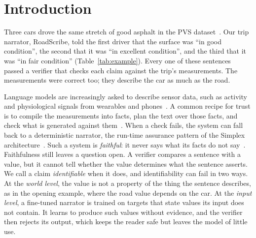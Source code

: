 \section{Introduction}
\label{sec:intro}

Three cars drove the same stretch of good asphalt in the PVS dataset~\cite{menegazzo2021pvs}.
Our trip narrator, RoadScribe, told the first driver that the surface was ``in good condition'', the second that it was ``in excellent condition'', and the third that it was ``in fair condition'' (Table~\ref{tab:example}).
Every one of these sentences passed a verifier that checks each claim against the trip's measurements.
The measurements were correct too; they describe the car as much as the road.

Language models are increasingly asked to describe sensor data, such as activity and physiological signals from wearables and phones~\cite{xu2024penetrative,li2025sensorllm,zhang2025sensorlm}.
A common recipe for trust is to compile the measurements into facts, plan the text over those facts, and check what is generated against them~\cite{wiseman2017challenges,moryossef2019step,jhamtani2021truce}. When a check fails, the system can fall back to a deterministic narrator, the run-time assurance pattern of the Simplex architecture~\cite{sha2001simplex}.
Such a system is \emph{faithful}: it never says what its facts do not say~\cite{maynez2020faithfulness}.
Faithfulness still leaves a question open. A verifier compares a sentence with a value, but it cannot tell whether the value determines what the sentence asserts. We call a claim \emph{identifiable} when it does, and identifiability can fail in two ways.
At the \emph{world level}, the value is not a property of the thing the sentence describes, as in the opening example, where the road value depends on the car.
At the \emph{input level}, a fine-tuned narrator is trained on targets that state values its input does not contain. It learns to produce such values without evidence, and the verifier then rejects its output, which keeps the reader safe but leaves the model of little use.

